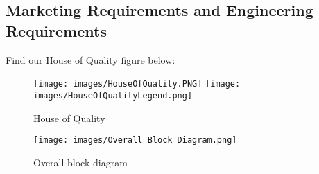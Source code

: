 \subsection{Marketing Requirements and Engineering Requirements}
Find our House of Quality figure below:
\begin{figure}[H]
    \centering
    \caption{House of Quality}
    \texttt{[image: images/HouseOfQuality.PNG]}
    \texttt{[image: images/HouseOfQualityLegend.png]}
\end{figure}
\begin{figure}[H]
    \caption{Overall block diagram}
    \centering
    \texttt{[image: images/Overall Block Diagram.png]}
\end{figure}